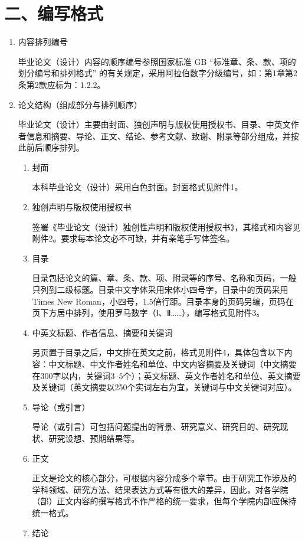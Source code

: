 \section*{二、编写格式}
\begin{enumerate}
\item 内容排列编号

毕业论文（设计）内容的顺序编号参照国家标准 GB ``标准章、条、款、项的划分编号和排列格式'' 的有关规定，采用阿拉伯数字分级编号，如：第1章第2条第2款应标为：1.2.2。

\item 论文结构（组成部分与排列顺序）

毕业论文（设计）主要由封面、独创声明与版权使用授权书、目录、中英文作者信息和摘要、导论、正文、结论、参考文献、致谢、附录等部分组成，并按此前后顺序排列。

\begin{enumerate}[label=(\arabic*)]
  \item 封面

  本科毕业论文（设计）采用白色封面。封面格式见附件1。
  \item 独创声明与版权使用授权书

  签署《毕业论文（设计）独创性声明和版权使用授权书》，其格式和内容见附件2。要求每本论文必不可缺，并有亲笔手写体签名。
  \item 目录

  目录包括论文的篇、章、条、款、项、附录等的序号、名称和页码，一般只列到二级标题。目录中文字体采用宋体小四号字，目录中的页码采用Times New Roman，小四号，1.5倍行距。目录本身的页码另编，页码在页下方居中排列，使用罗马数字（Ⅰ、Ⅱ……），编写格式见附件3。
  \item 中英文标题、作者信息、摘要和关键词

  另页置于目录之后，中文排在英文之前，格式见附件4，具体包含以下内容：中文标题、中文作者姓名和单位、中文内容摘要及关键词（中文摘要在300字以内，关键词3--5个）；英文标题、英文作者姓名和单位、英文摘要及关键词（英文摘要以250个实词左右为宜，关键词与中文关键词对应）。
  \item 导论（或引言）

  导论（或引言）可包括问题提出的背景、研究意义、研究目的、研究现状、研究设想、预期结果等。
  \item 正文

  正文是论文的核心部分，可根据内容分成多个章节。由于研究工作涉及的学科领域、研究方法、结果表达方式等有很大的差异，因此，对各学院（部）正文内容的撰写格式不作严格的统一要求，但每个学院内部应保持统一格式。
  \item 结论


\end{enumerate}
\end{enumerate}
